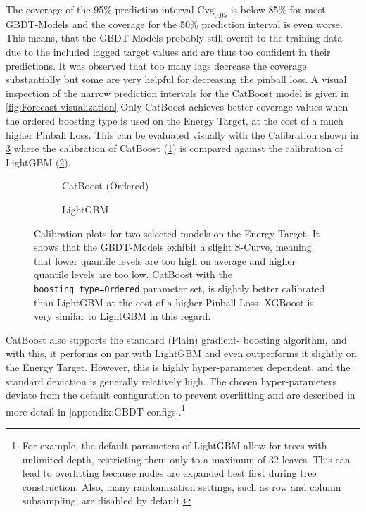 The coverage of the 95\% prediction interval $\text{Cvg}_{0.05}$ is below 85\% for most GBDT-Models and the coverage for the 50\% prediction interval is even worse. This means, that the GBDT-Models probably still overfit to the training data due to the included lagged target values and are thus too confident in their predictions. It was observed that too many lags decrease the coverage substantially but some are very helpful for decreasing the pinball loss. A visual inspection of the narrow prediction intervals for the CatBoost model is given in \cref{fig:Forecast-visualization} 
Only CatBoost achieves better coverage values when the ordered boosting type is used on the Energy
Target, at the cost of a much higher Pinball Loss. This can be evaluated visually with the Calibration shown in \cref{fig:calibration-comparison} where the calibration of CatBoost (\cref{fig:catboost-ordered-calibration}) is compared against the calibration of LightGBM (\cref{fig:lgbm-calibration}).
\begin{figure}[htbp]
    \centering
    \begin{subfigure}[b]{0.5\textwidth}
        \centering
        
        \caption{CatBoost (Ordered)}
        \label{fig:catboost-ordered-calibration}
    \end{subfigure}%
    \begin{subfigure}[b]{0.5\textwidth}
        \centering
        
        \caption{LightGBM}
        \label{fig:lgbm-calibration}
    \end{subfigure}
    \caption{Calibration plots for two selected models on the Energy Target. It shows that the GBDT-Models exhibit a slight S-Curve, meaning that lower quantile levels are too high on average and higher quantile levels are too low. CatBoost with the \texttt{boosting\_type=Ordered} parameter set, is slightly better calibrated than LightGBM at the cost of a higher Pinball Loss. XGBoost is very similar to LightGBM in this regard.}
    \label{fig:calibration-comparison}
\end{figure}

CatBoost also supports the standard (Plain) gradient-
boosting algorithm, and with this, it performs on par with LightGBM and even outperforms it slightly on
the Energy Target. However, this is highly hyper-parameter dependent, and the standard
deviation is generally relatively high. The chosen hyper-parameters deviate from the default 
configuration to prevent overfitting and are described in more detail in \cref{appendix:GBDT-configs}.\footnote{For example, the default parameters of LightGBM allow for trees with unlimited depth, restricting them only to a maximum of 32 leaves. This can lead to overfitting because nodes are expanded best first during tree construction. Also, many randomization settings, such as row and column subsampling, are disabled by default.}


